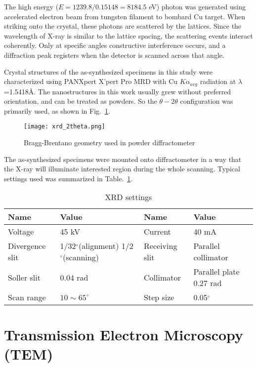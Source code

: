The high energy ($E = 1239.8/0.15148= 8184.5$ eV) photon was generated using accelerated electron beam from tungsten filament to bombard Cu target. When striking onto the crystal, these photons are scattered by the lattices. Since the wavelength of X-ray is similar to the lattice spacing, the scattering events interact coherently. Only at specific angles constructive interference occurs, and a diffraction peak registers when the detector is scanned across that angle.  

Crystal structures of the as-synthesized specimens in this study were characterized using PANXpert X’pert Pro MRD with Cu $K\alpha_{avg}$ radiation at $\lambda$=1.5418\AA. The nanostructures in this work usually grew without preferred orientation, and can be treated as powders. So the $\theta-2\theta$ configuration was primarily used, as shown in Fig.~\ref{fig:ch2theta}. 

\begin{figure}[htb]
\centering
\texttt{[image: xrd\_2theta.png]}

\caption[XRD configuration]{Bragg-Brentano geometry used in powder diffractometer}
\label{fig:ch2theta}
\end{figure}

The as-synthesized specimens were mounted onto diffractometer in a way that the X-ray will illuminate interested region during the whole scanning. Typical settings used was summarized in Table.~\ref{tab:ch2xrd}.

\begin{table}[htb]
\centering
\caption{XRD settings}\label{tab:ch2xrd}
\begin{tabular}{lp{2in}lp{2in}}
\toprule
Name & Value & Name & Value  \\
\midrule
Voltage   & 45 kV & Current & 40 mA \\
Divergence slit & 1/32$^\circ$(alignment) 1/2$^\circ$(scanning) & Receiving slit& Parallel collimator \\
Soller slit & 0.04 rad & Collimator & Parallel plate 0.27 rad \\
Scan range & $10 \sim 65 ^\circ$ & Step size & 0.05$^\circ$ \\
\bottomrule
\end{tabular}
\end{table}


\section{Transmission Electron Microscopy (TEM)}

